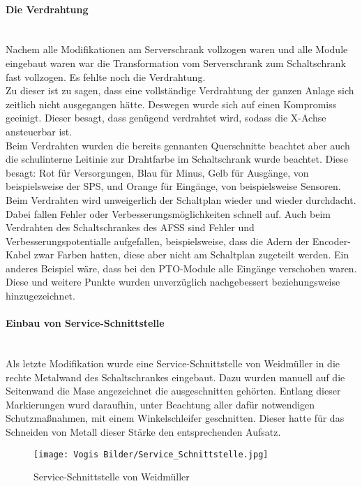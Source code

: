     \paragraph{Die Verdrahtung}\mbox{}\\
    Nachem alle Modifikationen am Serverschrank vollzogen waren und alle Module eingebaut waren war die Transformation vom Serverschrank zum Schaltschrank fast vollzogen. Es fehlte noch die Verdrahtung.\\
    Zu dieser ist zu sagen, dass eine vollständige Verdrahtung der ganzen Anlage sich zeitlich nicht ausgegangen hätte. Deswegen wurde sich auf einen Kompromiss geeinigt. Dieser besagt, dass genügend verdrahtet wird, sodass die X-Achse ansteuerbar ist.\\
    Beim Verdrahten wurden die bereits gennanten Querschnitte beachtet aber auch die schulinterne Leitinie zur Drahtfarbe im Schaltschrank wurde beachtet. Diese besagt: Rot für Versorgungen, Blau für Minus, Gelb für Ausgänge, von beispielsweise der SPS, und Orange für Eingänge, von  beispielsweise Sensoren.\\
    Beim Verdrahten wird unweigerlich der Schaltplan wieder und wieder durchdacht. Dabei fallen Fehler oder Verbesserungsmöglichkeiten schnell auf. Auch beim Verdrahten des Schaltschrankes des AFSS sind Fehler und Verbesserungspotentialle aufgefallen, beispielsweise, dass die Adern der Encoder-Kabel zwar Farben hatten, diese aber nicht am Schaltplan zugeteilt werden. Ein anderes Beispiel wäre, dass bei den PTO-Module alle Eingänge verschoben waren. Diese und weitere Punkte wurden unverzüglich nachgebessert beziehungsweise hinzugezeichnet.
    \paragraph{Einbau von Service-Schnittstelle}\mbox{}\\ 
    Als letzte Modifikation wurde eine Service-Schnittstelle von Weidmüller in die rechte Metalwand des Schaltschrankes eingebaut. Dazu wurden manuell auf die Seitenwand die Mase angezeichnet die ausgeschnitten gehörten. Entlang dieser Markierungen wurd daraufhin, unter Beachtung aller dafür notwendigen Schutzmaßnahmen, mit einem Winkelschleifer geschnitten. Dieser hatte für das Schneiden von Metall dieser Stärke den entsprechenden Aufsatz. 
    \begin{figure}[h]
        \centering
        \texttt{[image: Vogis Bilder/Service\_Schnittstelle.jpg]}
        \caption{Service-Schnittstelle von Weidmüller}
        \label{fig:Service_Schnittstelle}
    \end{figure}
